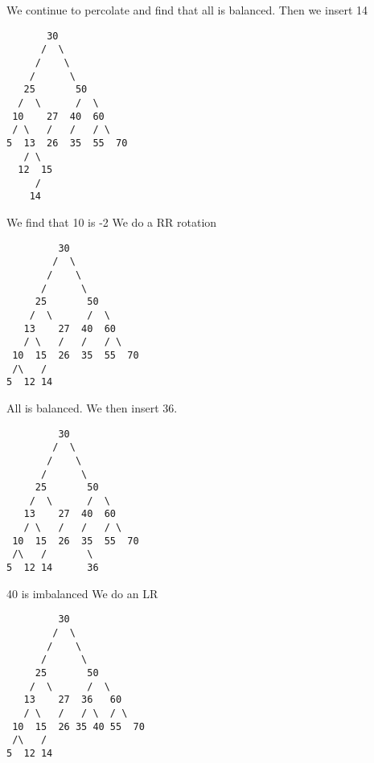 \documentclass{article}
\begin{document}
\begin{enumerate}
\begin{enumerate}
\begin{enumerate}
We continue to percolate and find that all is balanced.
Then we insert 14

    \begin{minipage}[t]{\linewidth}
    \begin{verbatim}
       30                        
      /  \                      
     /    \                   
    /      \
   25       50                
  /  \      /  \              
 10    27  40  60           
 / \   /   /   / \
5  13  26  35  55  70          
   / \
  12  15
     /
    14
    \end{verbatim}
    \end{minipage}

We find that 10 is -2
We do a RR rotation

    \begin{minipage}[t]{\linewidth}
    \begin{verbatim}
         30                        
        /  \                      
       /    \                   
      /      \
     25       50                
    /  \      /  \              
   13    27  40  60           
   / \   /   /   / \
 10  15  26  35  55  70          
 /\   /
5  12 14
    \end{verbatim}
    \end{minipage}

All is balanced.
We then insert 36.

    \begin{minipage}[t]{\linewidth}
    \begin{verbatim}
         30                        
        /  \                      
       /    \                   
      /      \
     25       50                
    /  \      /  \              
   13    27  40  60           
   / \   /   /   / \
 10  15  26  35  55  70          
 /\   /       \
5  12 14      36
    \end{verbatim}
    \end{minipage}

40 is imbalanced
We do an LR

    \begin{minipage}[t]{\linewidth}
    \begin{verbatim}
         30                        
        /  \                      
       /    \                   
      /      \
     25       50                
    /  \      /  \              
   13    27  36   60           
   / \   /   / \  / \
 10  15  26 35 40 55  70          
 /\   /        
5  12 14        

    \end{verbatim}
    \end{minipage}


\end{enumerate}
\end{enumerate}
\end{enumerate}
\end{document}
